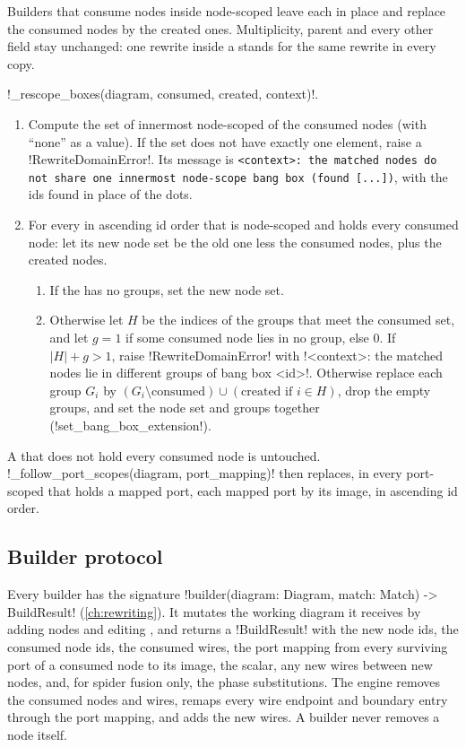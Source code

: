 Builders that consume nodes inside node-scoped \bboxes{} leave each \bbox{} in place and replace the consumed nodes by the created ones. Multiplicity, parent and every other field stay unchanged: one rewrite inside a \bbox{} stands for the same rewrite in every copy.

\begin{algorithm}[Rescoping]\label{alg:rules-rescope}
\py!_rescope_boxes(diagram, consumed, created, context)!.
\begin{enumerate}
\item Compute the set of innermost node-scoped \bboxes{} of the consumed nodes (with ``none'' as a value). If the set does not have exactly one element, raise a \py!RewriteDomainError!. Its message is \texttt{<context>: the matched nodes do not share one innermost node-scope bang box (found [...])}, with the ids found in place of the dots.
\item For every \bbox{} in ascending id order that is node-scoped and holds every consumed node: let its new node set be the old one less the consumed nodes, plus the created nodes.
  \begin{enumerate}
  \item If the \bbox{} has no groups, set the new node set.
  \item Otherwise let $H$ be the indices of the groups that meet the consumed set, and let $g=1$ if some consumed node lies in no group, else $0$. If $|H|+g>1$, raise \py!RewriteDomainError! with \code!<context>: the matched nodes lie in different groups of bang box <id>!. Otherwise replace each group $G_i$ by $(G_i\setminus\text{consumed})\cup(\text{created if }i\in H)$, drop the empty groups, and set the node set and groups together (\py!set_bang_box_extension!).
  \end{enumerate}
\end{enumerate}
\end{algorithm}

A \bbox{} that does not hold every consumed node is untouched. \py!_follow_port_scopes(diagram, port_mapping)! then replaces, in every port-scoped \bbox{} that holds a mapped port, each mapped port by its image, in ascending \bbox{} id order.

\subsection{Builder protocol}\label{sec:rules-builder-protocol}

Every builder has the signature \py!builder(diagram: Diagram, match: Match) -> BuildResult! (\cref{ch:rewriting}). It mutates the working diagram it receives by adding nodes and editing \bboxes{}, and returns a \py!BuildResult! with the new node ids, the consumed node ids, the consumed wires, the port mapping from every surviving port of a consumed node to its image, the scalar, any new wires between new nodes, and, for spider fusion only, the phase substitutions. The engine removes the consumed nodes and wires, remaps every wire endpoint and boundary entry through the port mapping, and adds the new wires. A builder never removes a node itself.

